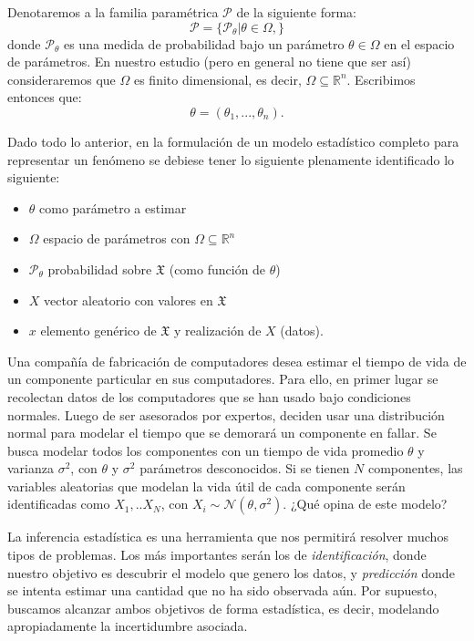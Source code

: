 Denotaremos a la familia paramétrica $\mathcal{P}$ de la siguiente forma:
\[\mathcal{P} = \{\mathcal{P}_\theta | \theta \in \Omega, \}\]
donde $\mathcal{P}_\theta $ es una medida de probabilidad bajo un parámetro $\theta \in \Omega$ en el espacio de parámetros. En nuestro estudio (pero en general no tiene que ser así) consideraremos que $\Omega$ es finito dimensional, es decir, $\Omega \subseteq \mathbb{R}^n$. Escribimos entonces que:
\[\theta = (\theta_1, ..., \theta_n). \]


Dado todo lo anterior, en la formulación de un modelo estadístico completo para representar un fenómeno se debiese tener lo siguiente plenamente identificado lo siguiente:

\begin{itemize}
    \item $\theta$ como parámetro a estimar
    \item $\Omega$ espacio de parámetros con $\Omega \subseteq \mathbb{R}^n$
    \item $\mathcal{P}_\theta$ probabilidad sobre $\mathfrak{X}$ (como función de $\theta$)
    \item ${X}$ vector aleatorio con valores en $\mathfrak{X}$
    \item $x$ elemento genérico de $\mathfrak{X}$ y realización de $X$ (datos).
\end{itemize}

\begin{example}
Una compañía de fabricación de computadores desea estimar el tiempo de vida de un componente particular en sus computadores. Para ello, en primer lugar se recolectan datos de los computadores que se han usado bajo condiciones normales. Luego de ser asesorados por expertos, deciden usar una distribución normal para modelar el tiempo que se demorará un componente en fallar. Se busca modelar todos los componentes con un tiempo de vida promedio $\theta$ y varianza $\sigma
^2$, con $\theta$ y $\sigma^{2}$  parámetros desconocidos. Si se tienen $N$ componentes, las variables aleatorias que modelan la vida útil de cada componente serán identificadas como 
$X_1,..X_N$, con $X_i \sim \mathcal{N}(\theta,\sigma^{2})$. ¿Qué opina de este modelo?
\end{example}

La inferencia estadística es una herramienta que nos permitirá resolver muchos tipos de problemas. Los más importantes serán los de \emph{identificación}, donde nuestro objetivo es descubrir el modelo que genero los datos, y \emph{predicción} donde se intenta estimar una cantidad que no ha sido observada aún. Por supuesto, buscamos alcanzar ambos objetivos de forma estadística, es decir,  modelando apropiadamente la incertidumbre asociada. 


